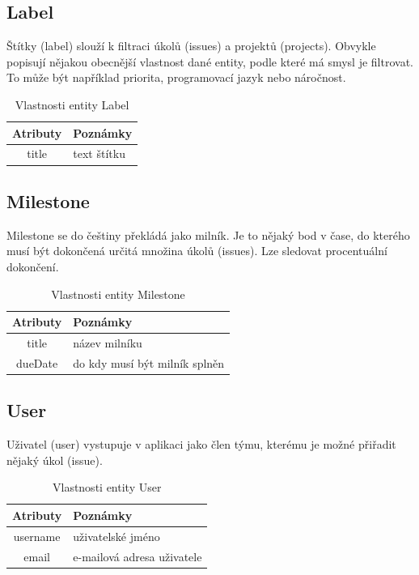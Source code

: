 \subsection{Label}
Štítky (label) slouží k filtraci úkolů (issues) a projektů (projects). Obvykle popisují nějakou obecnější vlastnost dané entity, podle které má smysl je filtrovat. To může být například priorita, programovací jazyk nebo náročnost.

\begin{table}[h]
\begin{center}
	\begin{tabular}{|c|l|}
	\hline
	Atributy & Poznámky \\
	\hline
	title & text štítku \\
	\hline
	\end{tabular}
\end{center}
\caption{Vlastnosti entity Label}
\label{tab:label}
\end{table}

\subsection{Milestone}
Milestone se do češtiny překládá jako milník. Je to nějaký bod v čase, do kterého musí být dokončená určitá množina úkolů (issues). Lze sledovat procentuální dokončení.

\begin{table}[h]
\begin{center}
	\begin{tabular}{|c|l|}
	\hline
	Atributy & Poznámky \\
	\hline
	title & název milníku \\
	dueDate & do kdy musí být milník splněn \\
	\hline
	\end{tabular}
\end{center}
\caption{Vlastnosti entity Milestone}
\label{tab:milestone}
\end{table}

\subsection{User}
Uživatel (user) vystupuje v aplikaci jako člen týmu, kterému je možné přiřadit nějaký úkol (issue).

\begin{table}[h]
\begin{center}
	\begin{tabular}{|c|l|}
	\hline
	Atributy & Poznámky \\
	\hline
	username & uživatelské jméno \\
	email & e-mailová adresa uživatele \\
	\hline
	\end{tabular}
\end{center}
\caption{Vlastnosti entity User}
\label{tab:user}
\end{table}

